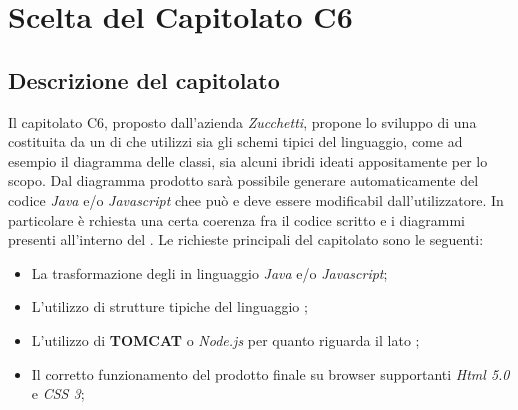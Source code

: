 \section{Scelta del Capitolato C6}
  \subsection{Descrizione del capitolato}
    Il capitolato C6, proposto dall'azienda \emph{Zucchetti}, propone lo sviluppo di una  costituita da un  di  che utilizzi sia gli schemi tipici
    del linguaggio, come ad esempio il diagramma delle classi, sia alcuni ibridi ideati appositamente per lo scopo.
    Dal diagramma  prodotto sarà possibile generare automaticamente del codice \emph{Java} e/o \emph{Javascript} chee può e deve essere modificabil dall'utilizzatore.
    In particolare è rchiesta una certa coerenza fra il codice scritto e i diagrammi presenti all'interno del .
    Le richieste principali del capitolato sono le seguenti:
    \begin{itemize}
      \item La trasformazione degli  in linguaggio \emph{Java} e/o \emph{Javascript};
      \item L'utilizzo di strutture tipiche del linguaggio ;
      \item L'utilizzo di \textbf{TOMCAT} o \emph{Node.js} per quanto riguarda il lato ;
      \item Il corretto funzionamento del prodotto finale su browser supportanti \emph{Html 5.0} e \emph{CSS 3};
     \end{itemize}
